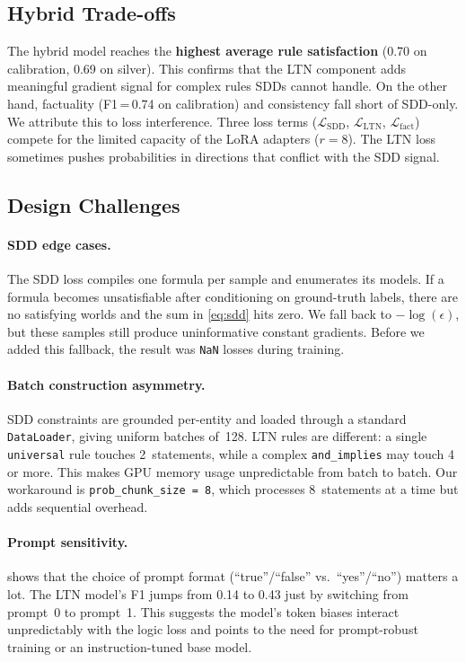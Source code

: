 \documentclass[11pt,a4paper]{article}
\newcommand{\SL}{\mathcal{L}_{\text{SDD}}}
\newcommand{\LTNloss}{\mathcal{L}_{\text{LTN}}}
\newcommand{\Lfact}{\mathcal{L}_{\text{fact}}}
\begin{document}
\subsection{Hybrid Trade-offs}

The hybrid model reaches the \textbf{highest average rule satisfaction}
(0.70 on calibration, 0.69 on silver).  This confirms that the LTN
component adds meaningful gradient signal for complex rules SDDs cannot
handle.  On the other hand, factuality (F1\,=\,0.74 on calibration) and
consistency fall short of SDD-only.  We attribute this to loss
interference. Three loss terms ($\SL$, $\LTNloss$, $\Lfact$) compete
for the limited capacity of the LoRA adapters ($r{=}8$).  The LTN loss
sometimes pushes probabilities in directions that conflict with the SDD
signal.

\subsection{Design Challenges}

\paragraph{SDD edge cases.}
The SDD loss compiles one formula per sample and enumerates its models.
If a formula becomes unsatisfiable after conditioning on ground-truth
labels, there are no satisfying worlds and the sum in \cref{eq:sdd} hits
zero.  We fall back to $-\log(\epsilon)$, but these samples still
produce uninformative constant gradients.  Before we added this fallback,
the result was \texttt{NaN} losses during training.

\paragraph{Batch construction asymmetry.}
SDD constraints are grounded per-entity and loaded through a standard
\texttt{DataLoader}, giving uniform batches of~128.  LTN rules are
different: a single \texttt{universal} rule touches 2~statements, while a
complex \texttt{and\_implies} may touch 4 or more.  This makes GPU memory
usage unpredictable from batch to batch.  Our workaround is
\texttt{prob\_chunk\_size\,=\,8}, which processes 8~statements at a time
but adds sequential overhead.

\paragraph{Prompt sensitivity.}
 shows that the choice of prompt format
(``true''/``false'' vs.\ ``yes''/``no'') matters a lot.  The LTN model's
F1 jumps from 0.14 to 0.43 just by switching from prompt~0 to prompt~1.
This suggests the model's token biases interact unpredictably with the
logic loss and points to the need for prompt-robust training or an
instruction-tuned base model.
\end{document}
